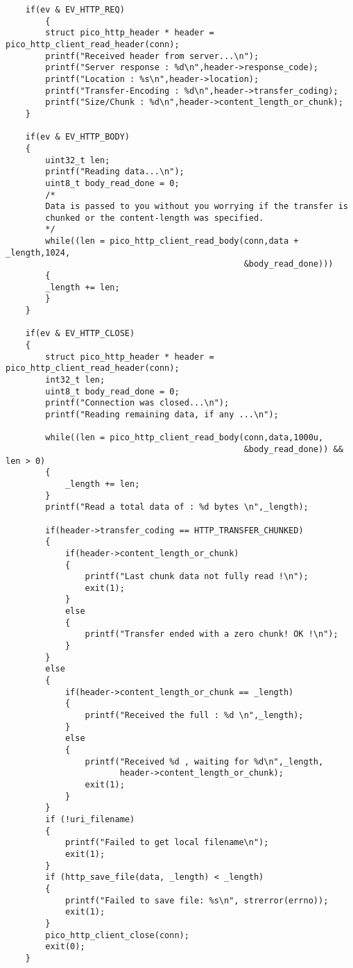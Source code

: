 \begin{verbatim}
    if(ev & EV_HTTP_REQ)
        {
        struct pico_http_header * header = pico_http_client_read_header(conn);
        printf("Received header from server...\n");
        printf("Server response : %d\n",header->response_code);
        printf("Location : %s\n",header->location);
        printf("Transfer-Encoding : %d\n",header->transfer_coding);
        printf("Size/Chunk : %d\n",header->content_length_or_chunk);
    }

    if(ev & EV_HTTP_BODY)
    {
        uint32_t len;
        printf("Reading data...\n");
        uint8_t body_read_done = 0;
        /*
        Data is passed to you without you worrying if the transfer is
        chunked or the content-length was specified.
        */
        while((len = pico_http_client_read_body(conn,data + _length,1024,
                                                &body_read_done)))
        {
        _length += len;
        }
    }

    if(ev & EV_HTTP_CLOSE)
    {
        struct pico_http_header * header = pico_http_client_read_header(conn);
        int32_t len;
        uint8_t body_read_done = 0;
        printf("Connection was closed...\n");
        printf("Reading remaining data, if any ...\n");

        while((len = pico_http_client_read_body(conn,data,1000u,
                                                &body_read_done)) && len > 0)
        {
            _length += len;
        }
        printf("Read a total data of : %d bytes \n",_length);

        if(header->transfer_coding == HTTP_TRANSFER_CHUNKED)
        {
            if(header->content_length_or_chunk)
            {
                printf("Last chunk data not fully read !\n");
                exit(1);
            }
            else
            {
                printf("Transfer ended with a zero chunk! OK !\n");
            }
        }
        else
        {
            if(header->content_length_or_chunk == _length)
            {
                printf("Received the full : %d \n",_length);
            }
            else
            {
                printf("Received %d , waiting for %d\n",_length,
                       header->content_length_or_chunk);
                exit(1);
            }
        }
        if (!uri_filename)
        {
            printf("Failed to get local filename\n");
            exit(1);
        }
        if (http_save_file(data, _length) < _length)
        {
            printf("Failed to save file: %s\n", strerror(errno));
            exit(1);
        }
        pico_http_client_close(conn);
        exit(0);
    }


\end{verbatim}
